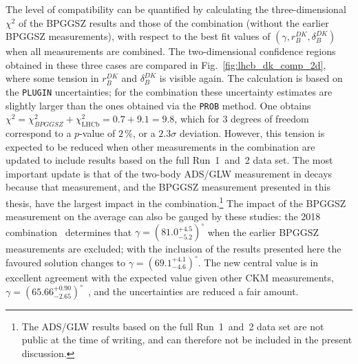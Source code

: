 The level of compatibility can be quantified by calculating the three-dimensional $\chi^2$ of the BPGGSZ results and those of the \lhcb combination (without the earlier BPGGSZ measurements), with respect to the best fit values of $(\gamma, r_B^{DK}, \delta_B^{DK})$ when all measurements are combined. The two-dimensional confidence regions obtained in these three cases are compared in Fig.~\ref{fig:lhcb_dk_comp_2d}, where some tension in $r_B^{DK}$ and $\delta_B^{DK}$ is visible again. The calculation is based on the \texttt{PLUGIN} uncertainties; for the \lhcb combination these uncertainty estimates are slightly larger than the ones obtained via the \texttt{PROB} method. One obtains $\chi^2=\chi^2_{BPGGSZ}+\chi^2_\text{LHCb} = 0.7 + 9.1 = 9.8$, which for 3 degrees of freedom correspond to a $p$-value of $2\,\%$, or a $2.3\sigma$ deviation. However, this tension is expected to be reduced when other measurements in the \lhcb combination are updated to include results based on the full Run~1~and~2 data set. The most important update is that of the two-body ADS/GLW measurement in \BtoDK decays because that measurement, and the BPGGSZ measurement presented in this thesis, have the largest impact in the combination.\footnote{The ADS/GLW results based on the full Run~1~and~2 data set are not public at the time of writing, and can therefore not be included in the present discussion.} The impact of the BPGGSZ measurement on the \lhcb average can also be gauged by these studies: the 2018 \lhcb combination~\cite{LHCb-CONF-2018-002} determines that $\gamma=(81.0^{+4.5}_{-5.2})^\circ$ when the earlier BPGGSZ measurements are excluded; with the inclusion of the results presented here the favoured solution changes to $\gamma=(69.1^{+4.1}_{-4.6})^\circ$. The new central value is in excellent agreement with the expected value given other CKM measurements, $\gamma=(65.66^{+0.90}_{-2.65})^\circ$~\cite{CKMFitter}, and the uncertainties are reduced a fair amount.


